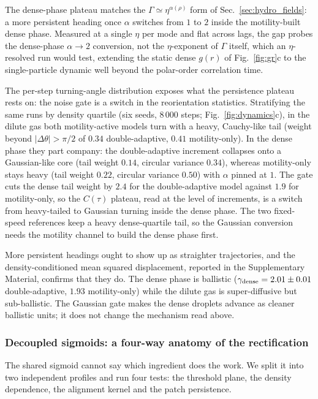 \documentclass[11pt,a4paper]{article}
\begin{document}
The dense-phase plateau matches the $\Gamma \simeq
\eta^{\alpha(\rho)}$ form of Sec.~\ref{sec:hydro_fields}: a more
persistent heading once $\alpha$ switches from $1$ to $2$ inside
the motility-built dense phase. Measured at a single $\eta$ per
mode and flat across lags, the gap probes the dense-phase
$\alpha \to 2$ conversion, not the $\eta$-exponent of $\Gamma$
itself, which an $\eta$-resolved run would test, extending
the static dense $g(r)$ of Fig.~\ref{fig:gr}c to the
single-particle dynamic well beyond the polar-order
correlation time.

The per-step turning-angle distribution exposes what the
persistence plateau rests on: the noise gate is a switch in the
reorientation statistics. Stratifying the same runs by
density quartile (six seeds, $8\,000$ steps;
Fig.~\ref{fig:dynamics}c), in the
dilute gas both motility-active models turn with a heavy,
Cauchy-like tail (weight beyond $|\Delta\theta| > \pi/2$ of
$0.34$ double-adaptive, $0.41$ motility-only). In the dense
phase they part company: the double-adaptive increment collapses
onto a Gaussian-like core (tail weight $0.14$, circular variance
$0.34$), whereas motility-only stays heavy (tail weight $0.22$,
circular variance $0.50$) with $\alpha$ pinned at $1$. The gate
cuts the dense tail weight by $2.4$ for the double-adaptive
model against $1.9$ for motility-only, so the $C(\tau)$ plateau,
read at the level of increments, is a switch from heavy-tailed
to Gaussian turning inside the dense phase. The two fixed-speed
references keep a heavy dense-quartile tail, so the Gaussian
conversion needs the motility channel to build the dense phase
first.

More persistent headings ought to show up as straighter
trajectories, and the density-conditioned mean squared
displacement, reported in the Supplementary Material, confirms
that they do. The dense phase is ballistic
($\gamma_{\rm dense} = 2.01 \pm 0.01$ double-adaptive, $1.93$
motility-only) while the dilute gas is super-diffusive but
sub-ballistic. The Gaussian gate makes the dense droplets advance
as cleaner ballistic units; it does not change the mechanism read
above.

\subsubsection{Decoupled sigmoids: a four-way anatomy of the rectification}
\label{sec:decoupled}

The shared sigmoid cannot say which ingredient does the work.
We split it into two independent profiles and run four tests:
the threshold plane, the density dependence, the alignment
kernel and the patch persistence.
\end{document}
